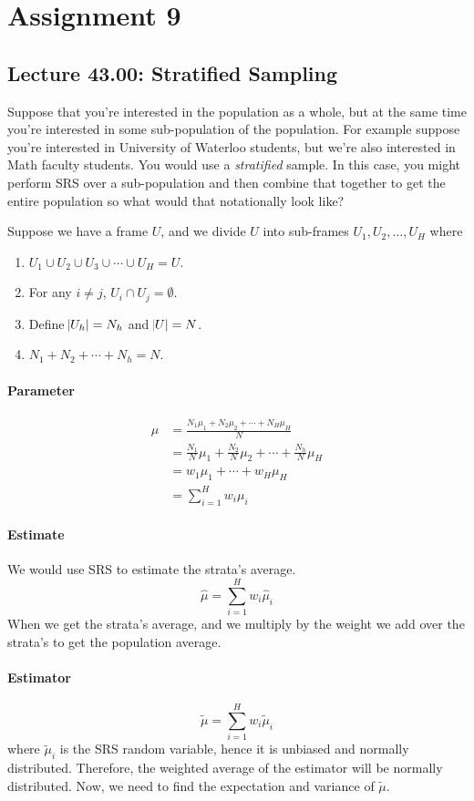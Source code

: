 \chapter{Assignment 9}
\section{Lecture 43.00: Stratified Sampling}
Suppose that you're interested in the population as a whole,
but at the same time you're interested in some sub-population of the population.
For example suppose you're interested in University of Waterloo students,
but we're also interested in Math faculty students.
You would use a \emph{stratified} sample.
In this case, you might perform SRS over a sub-population and then
combine that together to get the entire population so what would that notationally
look like?

Suppose we have a frame $ U $, and we divide $ U $ into sub-frames
$ U_1,U_2,\ldots,U_H $ where
\begin{enumerate}[(1)]
    \item $ U_1\cup U_2\cup U_3\cup \cdots \cup U_H=U $.
    \item For any $ i\ne j $, $ U_i\cap U_j=\emptyset $.
    \item Define $ \abs{U_h}=N_h $ and $ \abs{U}=N $.
    \item $ N_1+N_2+\cdots+N_h=N $.
\end{enumerate}
\subsubsection*{Parameter}
\begin{align*}
    \mu
     & =\frac{N_1 \mu_1+N_2 \mu_2+\cdots+N_H \mu_H}{N}                     \\
     & =\frac{N_1}{N} \mu_1+\frac{N_2}{N} \mu_2+\cdots+\frac{N_h}{N} \mu_H \\
     & =w_1 \mu_1+\cdots+w_H \mu_H                                         \\
     & =\sum_{i=1}^{H} w_i \mu_i
\end{align*}
\subsubsection*{Estimate}
We would use SRS to estimate the strata's average.
\[ \hat{\mu}=\sum_{i=1}^{H} w_i\hat{\mu}_i \]
When we get the strata's average,
and we multiply by the weight we add over the strata's to
get the population average.
\subsubsection*{Estimator}
\[ \tilde{\mu}=\sum_{i=1}^{H} w_i\tilde{\mu}_i \]
where $ \tilde{\mu}_i $ is the SRS random variable, hence it is unbiased
and normally distributed. Therefore, the weighted average of the estimator
will be normally distributed. Now, we need to find the expectation and variance
of $ \tilde{\mu} $.
